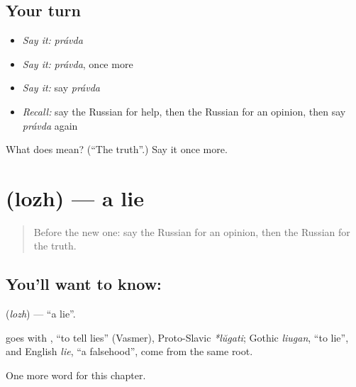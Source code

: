 \subsection*{Your turn}
\begin{itemize}
\raggedright
  \item \emph{Say it:} \emph{právda}
  \item \emph{Say it:} \emph{právda}, once more
  \item \emph{Say it:} say \emph{právda}
  \item \emph{Recall:} say the Russian for help, then the Russian for an opinion, then say \emph{právda} again
\end{itemize}

\begin{tcolorbox}[breakable,colback=teal!4,colframe=teal!35!black,title={Before you move on}]
What does  mean? (\textquotedblleft{}The truth\textquotedblright{}.) Say it once more.
\end{tcolorbox}
\section[\texorpdfstring{\ru{ложь} (lozh)}{ложь (lozh)}]{ (lozh) — a lie}

\label{lesson:RU-C169-lozh}



\begin{quote}
Before the new one: say the Russian for an opinion, then the Russian for the truth.
\end{quote}

\subsection*{You'll want to know: }
\textbf{} (\emph{lozh}) — \textquotedblleft{}a lie\textquotedblright{}.

\begin{cousinweb}
\textbf{} goes with \emph{}, \textquotedblleft{}to tell lies\textquotedblright{} (Vasmer), Proto-Slavic \emph{*lŭgati}; Gothic \emph{liugan}, \textquotedblleft{}to lie\textquotedblright{}, and English \emph{lie}, \textquotedblleft{}a falsehood\textquotedblright{}, come from the same root.
\end{cousinweb}

\begin{grammarlens}[title={What you've built}]
One more word for this chapter.
\end{grammarlens}

